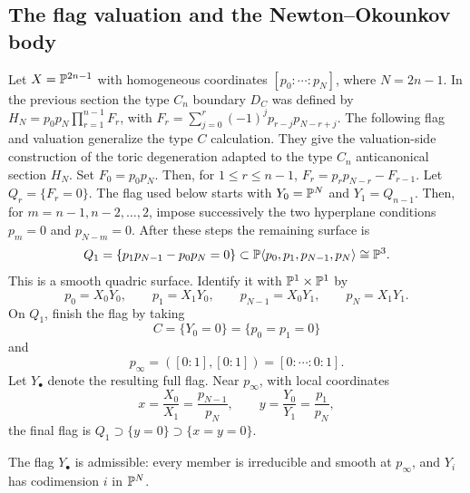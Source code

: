 \subsection{The flag valuation and the Newton--Okounkov body}
Let \(X=\mathbb{P}^{2n-1}\) with homogeneous coordinates \([p_0:\cdots:p_N]\), where \(N=2n-1\). In the previous section the type \(C_n\) boundary \(D_C\) was defined by \(H_N=p_0p_N\prod_{r=1}^{n-1}F_r\), with \(F_r=\sum_{j=0}^r(-1)^jp_{r-j}p_{N-r+j}\).
The following flag and valuation generalize the type \(C\) calculation. They give the valuation-side construction of the toric degeneration adapted to the type \(C_n\) anticanonical section \(H_N\).
Set \(F_0=p_0p_N\). Then, for \(1\le r\le n-1\), \(F_r=p_rp_{N-r}-F_{r-1}\).
Let \(Q_r=\{F_r=0\}\). The flag used below starts with \(Y_0=\mathbb{P}^N\) and \(Y_1=Q_{n-1}\). Then, for \(m=n-1,n-2,\ldots,2\), impose successively the two hyperplane conditions \(p_m=0\) and \(p_{N-m}=0\).
After these steps the remaining surface is
\[
Q_1=\{p_1p_{N-1}-p_0p_N=0\}
\subset \mathbb{P}\langle p_0,p_1,p_{N-1},p_N\rangle\cong \mathbb{P}^3.
\]
This is a smooth quadric surface. Identify it with \(\mathbb{P}^1\times\mathbb{P}^1\) by
\[
p_0=X_0Y_0,
\qquad
p_1=X_1Y_0,
\qquad
p_{N-1}=X_0Y_1,
\qquad
p_N=X_1Y_1.
\]
On \(Q_1\), finish the flag by taking
\[
C=\{Y_0=0\}=\{p_0=p_1=0\}
\]
and
\[
p_\infty=([0:1],[0:1])=[0:\cdots:0:1].
\]
Let \(Y_\bullet\) denote the resulting full flag. Near \(p_\infty\), with local coordinates
\[
x=\frac{X_0}{X_1}=\frac{p_{N-1}}{p_N},
\qquad
 y=\frac{Y_0}{Y_1}=\frac{p_1}{p_N},
\]
the final flag is \(Q_1\supset\{y=0\}\supset\{x=y=0\}\).

\begin{lemma}\label{lem:flag-admissible}
The flag \(Y_\bullet\) is admissible: every member is irreducible and smooth at \(p_\infty\), and \(Y_i\) has codimension \(i\) in \(\mathbb{P}^N\).
\end{lemma}

